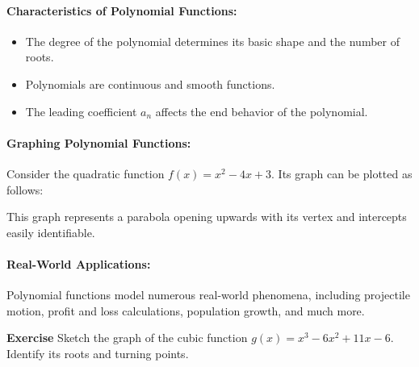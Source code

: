 \documentclass[a4paper,12pt]{book}
\newenvironment{exercise}[1][]
  {\par\medskip\noindent\textbf{Exercise #1} \rmfamily}
  {\medskip}
\begin{document}
\paragraph{Characteristics of Polynomial Functions:}
\begin{itemize}
    \item The degree of the polynomial determines its basic shape and the number of roots.
    \item Polynomials are continuous and smooth functions.
    \item The leading coefficient \( a_n \) affects the end behavior of the polynomial.
\end{itemize}

\paragraph{Graphing Polynomial Functions:}
Consider the quadratic function \( f(x) = x^2 - 4x + 3 \). Its graph can be plotted as follows:


This graph represents a parabola opening upwards with its vertex and intercepts easily identifiable.

\paragraph{Real-World Applications:}
Polynomial functions model numerous real-world phenomena, including projectile motion, profit and loss calculations, population growth, and much more.

\begin{exercise}
Sketch the graph of the cubic function \( g(x) = x^3 - 6x^2 + 11x - 6 \). Identify its roots and turning points.
\end{exercise}
\end{document}
